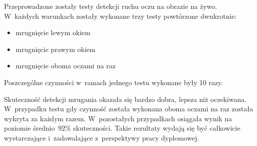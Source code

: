Przeprowadzone zostały testy detekcji ruchu oczu na obrazie na żywo. W~każdych warunkach zostały wykonane trzy testy powtórzone dwukrotnie:

\begin{itemize}
    \item mrugnięcie lewym okiem
    \item mrugnięcie prawym okiem
    \item mrugnięcie oboma oczami na raz
\end{itemize}

Poszczególne czynności w~ramach jednego testu wykonane były 10 razy. 



Skuteczność detekcji mrugania okazała się bardzo dobra, lepsza niż oczekiwana. W~przypadku testu gdy czynność została wykonana oboma oczami na raz została wykryta za każdym razem. W~pozostałych przypadkach osiągała wynik na poziomie średnio~$92\%$ skuteczności. Takie rezultaty wydają się być całkowicie wystarczające i~zadowalające z~perspektywy pracy dyplomowej. 
